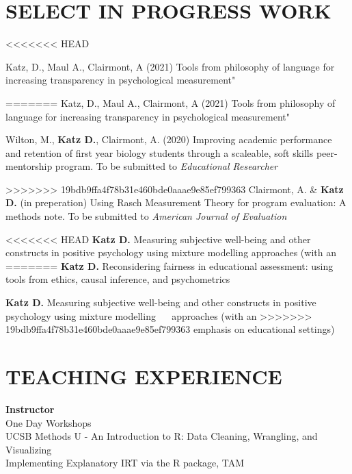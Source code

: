 \documentclass[12pt, oneside,]{memoir}
\begin{document}
\hypertarget{select-in-progress-work}{%
\section{SELECT IN PROGRESS WORK}\label{select-in-progress-work}}
\begin{hangparas}{.25in}{1}
<<<<<<< HEAD

Katz, D., Maul A., Clairmont, A (2021) Tools from philosophy of language
for increasing transparency in psychological measurement"

=======
Katz, D., Maul A., Clairmont, A (2021) Tools from philosophy of language
for increasing transparency in psychological measurement"

Wilton, M., \textbf{Katz D.}, Clairmont, A. (2020) Improving academic performance and retention of first year biology students through a scaleable, soft skills peer-mentorship program. To be submitted to \emph{Educational Researcher}

>>>>>>> 19bdb9ffa4f78b31e460bde0aaae9e85ef799363
\noindent Clairmont, A. \& \textbf{Katz D.} (in preperation) Using Rasch
Measurement Theory for program evaluation: A methods note. To be
submitted to \emph{American Journal of Evaluation}

<<<<<<< HEAD
\noindent \textbf{Katz D.} Measuring subjective well-being and other constructs in
positive psychology using mixture modelling approaches (with an
=======
\noindent \textbf{Katz D.} Reconsidering fairness in educational assessment: using
tools from ethics, causal inference, and psychometrics

\noindent \textbf{Katz D.} Measuring subjective well-being and other constructs in
positive psychology using mixture modelling ~~ approaches (with an
>>>>>>> 19bdb9ffa4f78b31e460bde0aaae9e85ef799363
emphasis on educational settings)
\end{hangparas}
\vspace{4mm}

\hypertarget{teaching-experience}{%
\section{TEACHING EXPERIENCE}\label{teaching-experience}}

\noindent\textbf{Instructor}\\
\noindent One Day Workshops\\
\hspace*{0.333em}\hspace*{0.333em}UCSB Methods U - An Introduction to R: Data Cleaning, Wrangling, and Visualizing\\
\hspace*{0.333em}\hspace*{0.333em}Implementing Explanatory IRT via the R package, TAM
\vspace{4mm}
\end{document}
